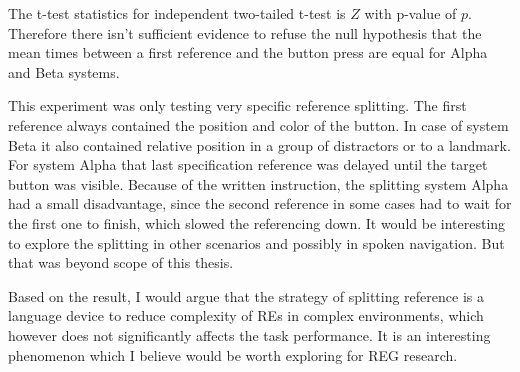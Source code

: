 The t-test statistics for independent two-tailed t-test is $Z$ with p-value of $p$. Therefore there isn't sufficient evidence to refuse the null hypothesis that the mean times between a first reference and the button press are equal for Alpha and Beta systems.

This experiment was only testing very specific reference splitting. The first reference always contained the position and color of the button. In case of system Beta it also contained relative position in a group of distractors or to a landmark. For system Alpha that last specification reference was delayed until the target button was visible. Because of the written instruction, the splitting system Alpha had a small disadvantage, since the second reference in some cases had to wait for the first one to finish, which slowed the referencing down. It would be interesting to explore the splitting in other scenarios and possibly in spoken navigation. But that was beyond scope of this thesis.

Based on the result, I would argue that the strategy of splitting reference is a language device to reduce complexity of REs in complex environments, which however does not significantly affects the task performance. It is an interesting phenomenon which I believe would be worth exploring for REG research.